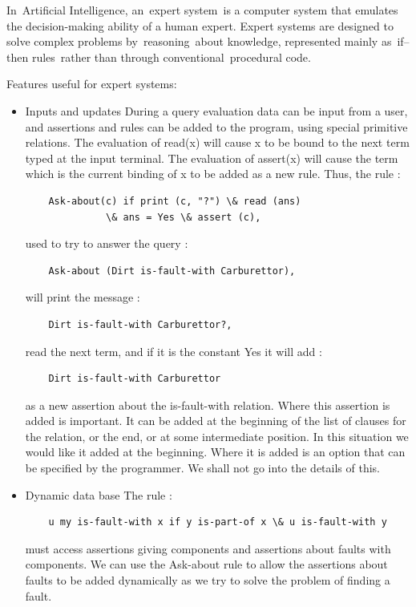 \documentclass[14pt]{article}
\begin{document}
In Artificial Intelligence, an expert system is a computer system that emulates the decision-making ability of a human expert. Expert systems are designed to solve complex problems by reasoning about knowledge, represented mainly as if–then rules rather than through conventional procedural code. 

Features useful for expert systems:
\begin{itemize}
\item Inputs and updates   
During a query evaluation data can be input from a user, and assertions 
and rules can be added to the program, using special primitive 
relations. The evaluation of read(x) will cause x to be bound to the next term typed at the input terminal. The evaluation of assert(x) will cause the term which is the current binding of x to be added as a new rule. Thus, the rule :
\begin{verbatim}
	Ask-about(c) if print (c, "?") \& read (ans)
		      \& ans = Yes \& assert (c),
\end{verbatim}
used to try to answer the query :
\begin{verbatim}
	Ask-about (Dirt is-fault-with Carburettor),
\end{verbatim}
will print the message :
\begin{verbatim}
	Dirt is-fault-with Carburettor?, 
\end{verbatim}
read the next term, and if it is the constant Yes it will add :
\begin{verbatim}
	Dirt is-fault-with Carburettor
\end{verbatim}
 as a new assertion about the is-fault-with relation. Where this assertion is added is important. It can be added at the beginning of the list of clauses for the relation, or the end, or at some intermediate position. In this situation we would like it added at the beginning. Where it is added is an option that can be specified by the programmer. We shall not go into the details of this. 

\item Dynamic data base 
The rule :
\begin{verbatim}
	u my is-fault-with x if y is-part-of x \& u is-fault-with y 
\end{verbatim}
must access assertions giving components and assertions about faults with components. We can use the Ask-about rule to allow the assertions about faults to be added dynamically as we try to solve the problem of finding a fault. 


\end{itemize}
\end{document}
